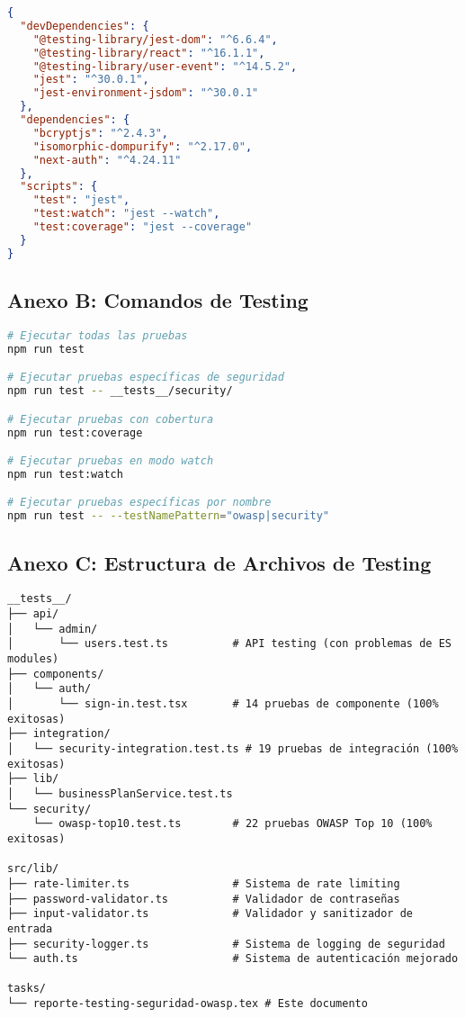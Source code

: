 \documentclass[12pt,a4paper]{article}
\begin{document}
\begin{lstlisting}[language=JSON, caption=Dependencias de Testing y Seguridad]
{
  "devDependencies": {
    "@testing-library/jest-dom": "^6.6.4",
    "@testing-library/react": "^16.1.1",
    "@testing-library/user-event": "^14.5.2",
    "jest": "^30.0.1",
    "jest-environment-jsdom": "^30.0.1"
  },
  "dependencies": {
    "bcryptjs": "^2.4.3",
    "isomorphic-dompurify": "^2.17.0",
    "next-auth": "^4.24.11"
  },
  "scripts": {
    "test": "jest",
    "test:watch": "jest --watch",
    "test:coverage": "jest --coverage"
  }
}
\end{lstlisting}

\subsection{Anexo B: Comandos de Testing}

\begin{lstlisting}[language=bash, caption=Comandos Principales de Testing]
# Ejecutar todas las pruebas
npm run test

# Ejecutar pruebas específicas de seguridad
npm run test -- __tests__/security/

# Ejecutar pruebas con cobertura
npm run test:coverage

# Ejecutar pruebas en modo watch
npm run test:watch

# Ejecutar pruebas específicas por nombre
npm run test -- --testNamePattern="owasp|security"
\end{lstlisting}

\subsection{Anexo C: Estructura de Archivos de Testing}

\begin{lstlisting}[caption=Estructura del Proyecto de Testing]
__tests__/
├── api/
│   └── admin/
│       └── users.test.ts          # API testing (con problemas de ES modules)
├── components/
│   └── auth/
│       └── sign-in.test.tsx       # 14 pruebas de componente (100% exitosas)
├── integration/
│   └── security-integration.test.ts # 19 pruebas de integración (100% exitosas)
├── lib/
│   └── businessPlanService.test.ts
└── security/
    └── owasp-top10.test.ts        # 22 pruebas OWASP Top 10 (100% exitosas)

src/lib/
├── rate-limiter.ts                # Sistema de rate limiting
├── password-validator.ts          # Validador de contraseñas
├── input-validator.ts             # Validador y sanitizador de entrada
├── security-logger.ts             # Sistema de logging de seguridad
└── auth.ts                        # Sistema de autenticación mejorado

tasks/
└── reporte-testing-seguridad-owasp.tex # Este documento
\end{lstlisting}
\end{document}
